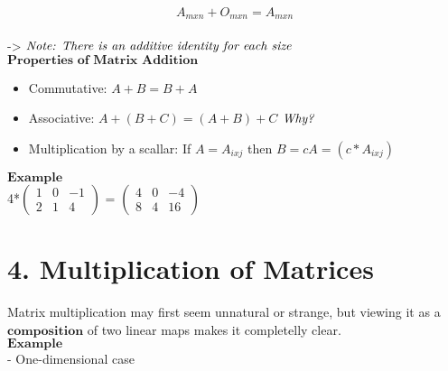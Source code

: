 \documentclass[]{article}
\providecommand{\tightlist}{%
  \setlength{\itemsep}{0pt}\setlength{\parskip}{0pt}}
\begin{document}
\[A_{mxn}+O_{mxn}=A_{mxn}\]\\

-\textgreater{}
\(\text{\textit{Note: There is an additive identity for each size}}\)\\

\(\textbf{Properties of Matrix Addition}\)\\

\begin{itemize}
\tightlist
\item
  Commutative: \(A+B = B+A\)\\
\item
  Associative: \(A+(B+C) = (A+B)+C\) \(\text{\textit{Why?}}\)\\
\item
  Multiplication by a scallar: If \(A = A_{ixj}\) then
  \(B=cA=(c*A_{ixj})\)
\end{itemize}

\(\mathbf{Example}\)\\

4*\(\begin{pmatrix} 1 & 0 & -1 \\ 2 & 1 & 4\end{pmatrix}\) =
\(\begin{pmatrix} 4 & 0 & -4 \\ 8 & 4 & 16\end{pmatrix}\)\\

\section{\texorpdfstring{4. Multiplication of Matrices\\
}{4. Multiplication of Matrices }}\label{multiplication-of-matrices}

Matrix multiplication may first seem unnatural or strange, but viewing
it as a \(\textbf{composition}\) of two linear maps makes it completelly
clear.\\

\(\mathbf{Example}\)\\
 - One-dimensional case

\begin{center}
  \end{center}
\end{document}
